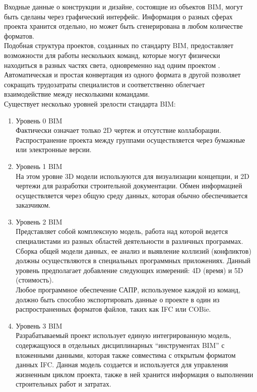 \documentclass[a4paper,14pt]{extreport} %
\begin{document}
Входные данные о конструкции и дизайне, состоящие из объектов BIM, могут быть сделаны через графический интерфейс. Информация о разных сферах проекта хранится отдельно, но может быть сгенерирована в любом количестве форматов. \\
Подобная структура проектов, созданных по стандарту BIM, предоставляет возможности для работы нескольких команд, которые могут физически находиться в разных частях света, одновременно над одним проектом \cite{BIM_ADVANTAGES}. Автоматическая и простая конвертация из одного формата в другой позволяет сокращать трудозатраты специалистов и соответственно облегчает взаимодействие между несколькими командами. \\
Существует несколько уровней зрелости стандарта BIM:
\begin{enumerate}
\item Уровень 0 BIM \\
Фактически означает только 2D чертеж и отсутствие коллаборации. Распространение проекта между группами осуществляется через бумажные или электронные версии.
\item Уровень 1 BIM \\
На этом уровне 3D модели используются для визуализации концепции, и 2D чертежи для разработки строительной документации. Обмен информацией осуществляется через общую среду данных, которая обычно обеспечивается заказчиком.
\item Уровень 2 BIM \\
Представляет собой комплексную модель, работа над которой ведется специалистами из разных областей деятельности в различных программах. Сборка общей модели данных, ее анализ и выявление коллизий (конфликтов) должны осуществляются в специальных программных приложениях. Данный уровень предполагает добавление следующих измерений: 4D (время) и 5D (стоимость). \\
Любое программное обеспечение САПР, используемое каждой из команд, должно быть способно экспортировать данные о проекте в один из распространенных форматов файлов, таких как IFC или COBie.
\item Уровень 3 BIM \\
Разрабатываемый проект использует единую интегрированную модель, содержащуюся в отдельных дисциплинарных “инструментах BIM” с вложенными данными, которая также совместима с открытым форматом данных IFC. Данная модель создается и используется для управления жизненным циклом проекта, также в ней хранится информация о выполнении строительных работ и затратах.
\end{enumerate}
\end{document}
